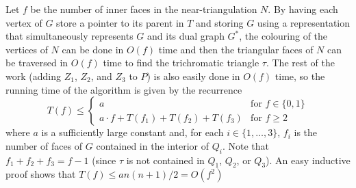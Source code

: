 \documentclass[kpfonts]{patmorin}
\let\le\leqslant
\let\ge\geqslant
\begin{document}
Let $f$ be the number of inner faces in the near-triangulation $N$.  By having each vertex of $G$ store a pointer to its parent in $T$ and storing $G$ using a representation that simultaneously represents $G$ and its dual graph $G^*$, the colouring of the vertices of $N$ can be done in $O(f)$ time and then the triangular faces of $N$ can be traversed in $O(f)$ time to find the trichromatic triangle $\tau$. The rest of the work (adding $Z_1$, $Z_2$, and $Z_3$ to $P$) is also easily done in $O(f)$ time, so the running time of the algorithm is given by the recurrence
\[  T(f) \le \begin{cases}
           a & \text{for $f\in\{0,1\}$} \\
           a\cdot f + T(f_1)+T(f_2)+T(f_3) & \text{for $f\ge 2$}
         \end{cases}
 \]
where $a$ is a sufficiently large constant and, for each $i\in\{1,\ldots,3\}$, $f_i$ is the number of faces of $G$ contained in the interior of $Q_i$.
Note that $f_1+f_2+f_3=f-1$ (since $\tau$ is not contained in $Q_1$, $Q_2$, or $Q_3$).  An easy inductive proof shows that $T(f) \le an(n+1)/2 = O(f^2)$
\end{document}
